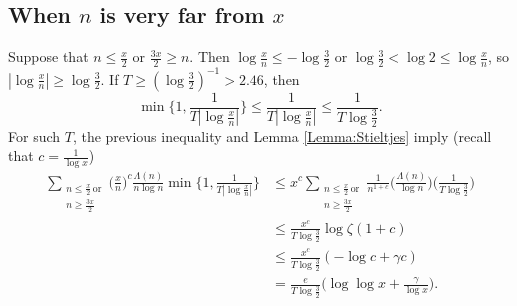\documentclass[10pt,reqno]{amsart}
\theoremstyle{plain}
\theoremstyle{definition}
\begin{document}
\subsection{When $n$ is very far from $x$}\label{Subsection:Far}
Suppose that $n \leq \frac{x}{2}$ or $\frac{3x}{2} \geq n$. 
Then $\log \frac{x}{n} \leq -\log \frac{3}{2}$ or $\log \frac{3}{2} <\log 2 \leq \log \frac{x}{n}$, so $|\log \frac{x}{n}| \geq \log \frac{3}{2}$.
If $T \geq (\log \frac{3}{2})^{-1} > 2.46$, then
\begin{equation*}
    \min\Big\{ 1 , \frac{1}{T | \log \frac{x}{n}| } \Big\}  
    \leq \frac{1}{T  |\log \frac{x}{n}|} 
    \leq \frac{1}{T  \log \frac{3}{2}}.
\end{equation*}
For such $T$, the previous inequality and Lemma \ref{Lemma:Stieltjes} imply (recall that $c = \frac{1}{\log x}$)
\begin{align}
    \sum_{\substack{n \leq \frac{x}{2}\, \text{or}\\ n \geq  \frac{3x}{2}}}  \Big( \frac{x}{n}\Big)^c  \frac{ \Lambda(n) }{n \log n} \min\Big\{ 1 , \frac{1}{T | \log \frac{x}{n} |} \Big\}
    &\leq x^c \sum_{\substack{n \leq \frac{x}{2}\, \text{or}\\ n \geq  \frac{3x}{2} }} \frac{1}{n^{1+c}}\bigg( \frac{\Lambda(n)}{\log n}\bigg) \bigg(\frac{1}{T  \log \frac{3}{2} } \bigg)  \nonumber \\
    &\leq \frac{ x^c}{T\log \frac{3}{2}}  \log \zeta(1+c) \nonumber \\
    &\leq \frac{ x^c}{T \log \frac{3}{2}} ( - \log c + \gamma c) \nonumber \\
    &= \frac{e}{T \log \frac{3}{2}}\bigg(\log \log x + \frac{\gamma}{\log x} \bigg).
    \label{eq:VeryFar}
\end{align}

\end{document}
